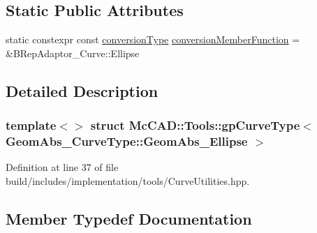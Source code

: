 \subsection*{Static Public Attributes}
\begin{DoxyCompactItemize}
\item 
static constexpr const \hyperlink{structMcCAD_1_1Tools_1_1gpCurveType_3_01GeomAbs__CurveType_1_1GeomAbs__Ellipse_01_4_a0a0d12fadf9056491f9ea92a4f59b293}{conversion\+Type} \hyperlink{structMcCAD_1_1Tools_1_1gpCurveType_3_01GeomAbs__CurveType_1_1GeomAbs__Ellipse_01_4_a2d0e1a980af92a4503032c3877d30015}{conversion\+Member\+Function} = \&B\+Rep\+Adaptor\+\_\+\+Curve\+::\+Ellipse
\end{DoxyCompactItemize}


\subsection{Detailed Description}
\subsubsection*{template$<$$>$\newline
struct Mc\+C\+A\+D\+::\+Tools\+::gp\+Curve\+Type$<$ Geom\+Abs\+\_\+\+Curve\+Type\+::\+Geom\+Abs\+\_\+\+Ellipse $>$}



Definition at line 37 of file build/includes/implementation/tools/\+Curve\+Utilities.\+hpp.



\subsection{Member Typedef Documentation}
\mbox{\label{structMcCAD_1_1Tools_1_1gpCurveType_3_01GeomAbs__CurveType_1_1GeomAbs__Ellipse_01_4_a0a0d12fadf9056491f9ea92a4f59b293}} 
